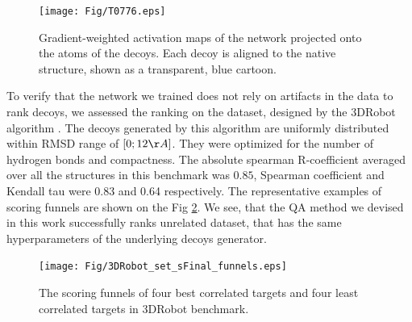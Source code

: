 \begin{figure}[H]
    \centering
    \texttt{[image: Fig/T0776.eps]}
%
    \caption{Gradient-weighted activation maps of the network
    projected onto the atoms of the decoys. Each decoy is aligned to
    the native structure, shown as a transparent, blue cartoon.}
%
    \label{Fig:GradCAMT0776_more}
\end{figure}

To verify that the network we trained does not rely on artifacts in
the data to rank decoys, we assessed the ranking on the dataset,
designed by the 3DRobot algorithm \cite{deng20163drobot}. The decoys
generated by this algorithm are uniformly distributed within RMSD
range of $[0; 12\AA]$. They were optimized for the number of hydrogen
bonds and compactness.  The absolute spearman R-coefficient averaged
over all the structures in this benchmark was $0.85$, Spearman
coefficient and Kendall tau were 0.83 and 0.64 respectively. The
representative examples of scoring funnels are shown on the
Fig \ref{Fig:3DRobotBenchmark}.  We see, that the QA method we devised
in this work successfully ranks unrelated dataset, that has the same
hyperparameters of the underlying decoys generator.

\begin{figure}[H]
    \centering
    \texttt{[image: Fig/3DRobot\_set\_sFinal\_funnels.eps]}
%
    \caption{The scoring funnels of four best correlated targets and
    four least correlated targets in 3DRobot benchmark.}
%
    \label{Fig:3DRobotBenchmark}
\end{figure}
